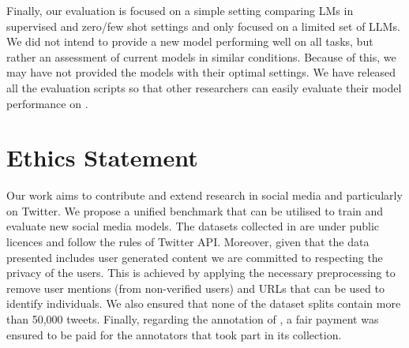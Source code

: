 Finally, our evaluation is focused on a simple setting comparing \acp{LM} in supervised and zero/few shot settings and only focused on a limited set of \acp{LLM}. We did not intend to provide a new model performing well on all tasks, but rather an assessment of current models in similar conditions. Because of this, we may have not provided the models with their optimal settings. We have released all the evaluation scripts so that other researchers can easily evaluate their model performance on {\DATASET}.


\section*{Ethics Statement}
Our work aims to contribute and extend research in social media and particularly on Twitter. We propose a unified benchmark that can be utilised to train and evaluate new social media models.
The datasets collected in {\DATASET} are under public licences and follow the rules of Twitter \ac{API}. Moreover, given that the data presented includes user generated content we are committed to respecting the privacy of the users. This is achieved by applying the necessary preprocessing to remove user mentions (from non-verified users) and \acp{URL} that can be used to identify individuals. We also ensured that none of the dataset splits contain more than 50,000 tweets.
Finally, regarding the annotation of {\TweetSimilarity}, a fair payment was ensured to be paid for the annotators that took part in its collection.


